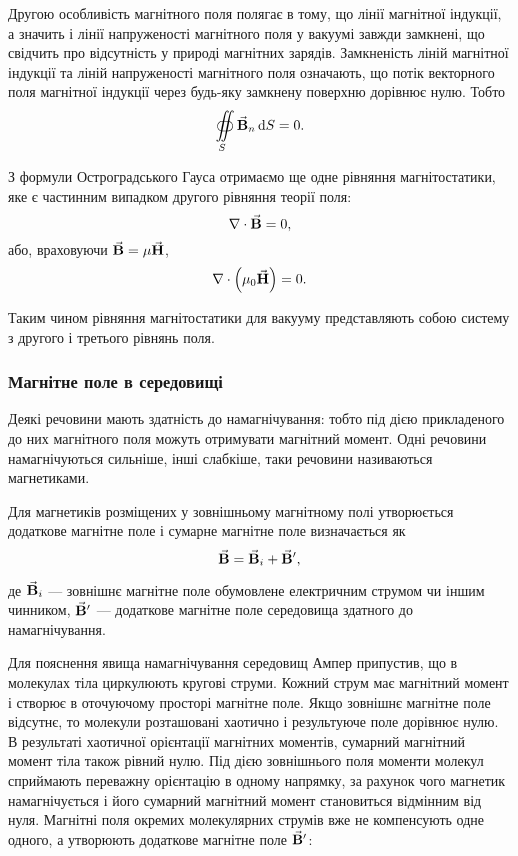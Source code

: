 Другою особливість магнітного поля полягає в тому, що лінії магнітної індукції, а значить і лінії напруженості магнітного поля у вакуумі завжди замкнені, що свідчить про відсутність у природі магнітних зарядів. Замкненість ліній магнітної індукції та ліній напруженості магнітного поля означають, що потік векторного поля магнітної індукції через будь-яку замкнену поверхню дорівнює нулю. Тобто
\begin{equation}
	\displaystyle\oiint\limits_S {\vec{\mathbf{B}}}_n \mathop{}\!\mathrm{d} S = 0.
\end{equation}

З формули Остроградського Гауса отримаємо ще одне рівняння магнітостатики, яке є частинним випадком другого рівняння теорії поля:
\begin{equation}
	\nabla \cdot {\vec{\mathbf{B}}} = 0,
\end{equation}
або, враховуючи ${\vec{\mathbf{B}}} = \mu {\vec{\mathbf{H}}}$,
\begin{equation}
    \label{eq:magnetostatics-equation-second-field-equation}
	\nabla \cdot \left(\mu_0 {\vec{\mathbf{H}}}\right) = 0.
\end{equation}

Таким чином рівняння магнітостатики для вакууму представляють собою систему з другого і третього рівнянь поля.

\subsubsection{Магнітне поле в середовищі}

Деякі речовини мають здатність до намагнічування: тобто під дією прикладеного до них магнітного поля можуть отримувати магнітний момент. Одні речовини намагнічуються сильніше, інші слабкіше, таки речовини називаються магнетиками. \medskip

Для магнетиків розміщених у зовнішньому магнітному полі утворюється додаткове магнітне поле і сумарне магнітне поле визначається як
\begin{equation}
	{\vec{\mathbf{B}}} = {\vec{\mathbf{B}}}_i + {\vec{\mathbf{B}}}',
\end{equation}

де ${\vec{\mathbf{B}}}_i$ --- зовнішнє магнітне поле обумовлене електричним струмом чи іншим чинником, ${\vec{\mathbf{B}}}'$ --- додаткове магнітне поле середовища здатного до намагнічування.  \medskip

Для пояснення явища намагнічування середовищ Ампер припустив, що в молекулах тіла циркулюють кругові струми. Кожний струм має магнітний момент і створює в оточуючому просторі магнітне поле. Якщо зовнішнє магнітне поле відсутнє, то молекули розташовані хаотично і результуюче поле дорівнює нулю.  В результаті хаотичної орієнтації магнітних моментів, сумарний магнітний момент  тіла також рівний нулю. Під дією зовнішнього поля моменти молекул сприймають переважну орієнтацію в одному напрямку, за рахунок чого магнетик намагнічується і його сумарний магнітний момент становиться відмінним від нуля. Магнітні поля окремих молекулярних струмів вже не компенсують одне одного, а утворюють додаткове магнітне поле ${\vec{\mathbf{B}}}'$:
\begin{figure}[H]
	\centering
\end{figure}

